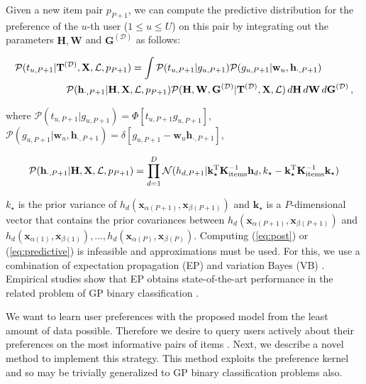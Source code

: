 \vspace{-0.4cm}
\normalsize Given a new item pair $p_{P+1}$, we can compute the predictive distribution for the preference of the $u$-th user ($1 \leq u \leq U$) on this pair by integrating out the parameters $\mathbf{H},\mathbf{W}$ and $\mathbf{G}^{(\mathcal{D})}$ as follows:

\vspace{-0.65cm}
{\small
\begin{align}
\mathcal{P}(t_{u,P+1}|&\mathbf{T}^{(\mathcal{D})},\mathbf{X},\mathcal{L},p_{P+1}) =
\int \mathcal{P}(t_{u,P+1}|g_{u,P+1}) \mathcal{P}(g_{u,P+1}|\mathbf{w}_u,\mathbf{h}_{\cdot,P+1})\notag\\
 & \quad \mathcal{P}(\mathbf{h}_{\cdot,P+1}|\mathbf{H},\mathbf{X},\mathcal{L},p_{P+1})
\mathcal{P}(\mathbf{H},\mathbf{W},\mathbf{G}^{(\mathcal{D})}|\mathbf{T}^{(\mathcal{D})},\mathbf{X},\mathcal{L})
\,d\mathbf{H}\,d\mathbf{W}\,d\mathbf{G}^{(\mathcal{D})}\,,
\label{eq:predictions}
\end{align}
}

\vspace{-0.5cm}
\normalsize where $\mathcal{P}(t_{u,P+1}|g_{u,P+1})=\Phi[t_{u,P+1}g_{u,P+1}]$,
$\mathcal{P}(g_{u,P+1}|\mathbf{w}_u,\mathbf{h}_{\cdot,P+1})=\delta[ g_{u,P+1} - \mathbf{w}_u \mathbf{h}_{\cdot,P+1}]$,

\vspace{-0.45cm}
{\small
\begin{equation}
\mathcal{P}(\mathbf{h}_{\cdot,P+1}|\mathbf{H},\mathbf{X},\mathcal{L},p_{P+1})
=\prod_{d=1}^D \mathcal{N}(h_{d,P+1}|\mathbf{k}_\star^\text{T} \mathbf{K}^{-1}_\text{items} \mathbf{h}_d, k_\star -
\mathbf{k}_\star^\text{T}  \mathbf{K}^{-1}_\text{items} \mathbf{k}_\star)
\label{eq:predictive}
\end{equation}
}

\vspace{-0.5cm}
\normalsize $k_\star$ is the prior variance of $h_d(\mathbf{x}_{\alpha(P+1)}, \mathbf{x}_{\beta(P+1)})$
and $\mathbf{k}_\star$ is a $P$-dimensional vector that contains the prior covariances between $h_d(\mathbf{x}_{\alpha(P+1)}, \mathbf{x}_{\beta(P+1)})$
and $h_d(\mathbf{x}_{\alpha(1)}, \mathbf{x}_{\beta(1)}),\ldots,h_d(\mathbf{x}_{\alpha(P)}, \mathbf{x}_{\beta(P)})$.
Computing (\ref{eq:post}) or (\ref{eq:predictive})
is infeasible and approximations must be used.
For this, we use a combination of expectation propagation (EP) \citep{Minka2001} and variation Bayes (VB) \citep{Ghahramani2001}.
Empirical studies show that EP obtains state-of-the-art performance 
in the related problem of GP binary classification \citep{nickisch2008}.

We want to learn user preferences with the proposed model
from the least amount of data possible. Therefore we desire to query
users actively about their preferences on the most informative pairs of items \citep{brochu2007active}.
Next, we describe a novel method to implement this strategy.
This method exploits the preference kernel and so may
be trivially generalized to GP binary classification problems also.
